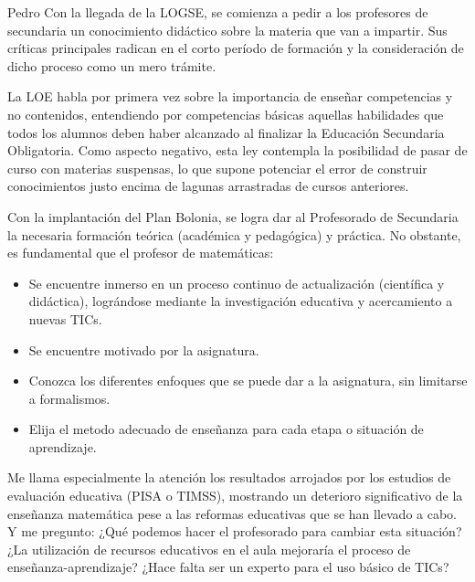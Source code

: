 \begin{opin}{\pedrocolor}{Pedro}
Con la llegada de la LOGSE, se comienza a pedir a los profesores de secundaria un conocimiento  didáctico sobre la materia que van a impartir. Sus críticas principales radican en el corto período de formación y la consideración de dicho proceso como un mero trámite.

La LOE habla por primera vez sobre la importancia de enseñar competencias y no contenidos, entendiendo por competencias básicas aquellas habilidades que todos los alumnos deben haber alcanzado al finalizar la Educación Secundaria Obligatoria. Como aspecto negativo, esta ley contempla la posibilidad de pasar de curso con materias suspensas, lo que supone potenciar el error de construir conocimientos justo encima de lagunas arrastradas de cursos anteriores.

Con la implantación del Plan Bolonia, se logra dar al Profesorado de Secundaria la necesaria formación teórica (académica y pedagógica) y práctica.  No obstante, es fundamental que el profesor de matemáticas:

\begin{itemize}
\item Se encuentre inmerso en un proceso continuo de actualización (científica y didáctica), lográndose mediante la investigación educativa y acercamiento a nuevas TICs. 
\item Se encuentre motivado por la asignatura. 
\item Conozca los diferentes enfoques que se puede dar a la asignatura, sin limitarse a formalismos. 
\item Elija el metodo adecuado de enseñanza para cada etapa o situación de aprendizaje. 

\end{itemize}

Me llama especialmente la atención los resultados arrojados por los estudios de evaluación educativa (PISA o TIMSS), mostrando un deterioro significativo de la enseñanza matemática pese a las reformas educativas que se han llevado a cabo. Y me pregunto: ¿Qué podemos hacer el profesorado para cambiar esta situación? ¿La utilización de recursos educativos en el aula mejoraría el proceso de enseñanza-aprendizaje? ¿Hace falta ser un experto para el uso básico de TICs?



\end{opin}
